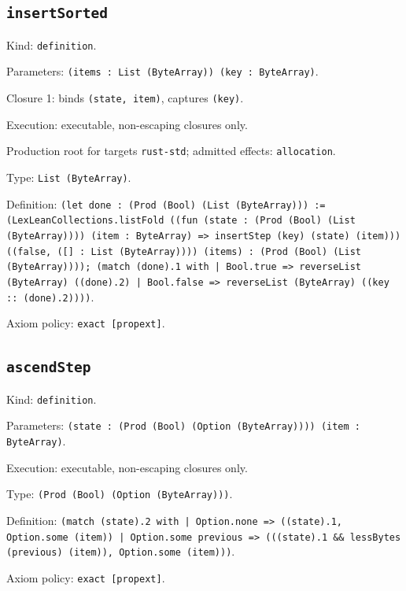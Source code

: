 \documentclass[11pt]{article}
\begin{document}
\subsection*{\texttt{insertSorted}}
\noindent Kind: \texttt{definition}.\par
\noindent Parameters: \texttt{(items : List (ByteArray)) (key : ByteArray)}.\par
\noindent Closure 1: binds \texttt{(state, item)}, captures \texttt{(key)}.\par
\noindent Execution: executable, non-escaping closures only.\par
\noindent Production root for targets \texttt{rust-std}; admitted effects: \texttt{allocation}.\par
\noindent Type: \texttt{List (ByteArray)}.\par
\noindent Definition: \texttt{(let done : (Prod (Bool) (List (ByteArray))) := (LexLeanCollections.listFold ((fun (state : (Prod (Bool) (List (ByteArray)))) (item : ByteArray) => insertStep (key) (state) (item))) ((false, ([] : List (ByteArray)))) (items) : (Prod (Bool) (List (ByteArray)))); (match (done).1 with | Bool.true => reverseList (ByteArray) ((done).2) | Bool.false => reverseList (ByteArray) ((key :: (done).2))))}.\par
\noindent Axiom policy: \texttt{exact [propext]}.\par
\subsection*{\texttt{ascendStep}}
\noindent Kind: \texttt{definition}.\par
\noindent Parameters: \texttt{(state : (Prod (Bool) (Option (ByteArray)))) (item : ByteArray)}.\par
\noindent Execution: executable, non-escaping closures only.\par
\noindent Type: \texttt{(Prod (Bool) (Option (ByteArray)))}.\par
\noindent Definition: \texttt{(match (state).2 with | Option.none => ((state).1, Option.some (item)) | Option.some previous => (((state).1 \&\& lessBytes (previous) (item)), Option.some (item)))}.\par
\noindent Axiom policy: \texttt{exact [propext]}.\par
\end{document}
